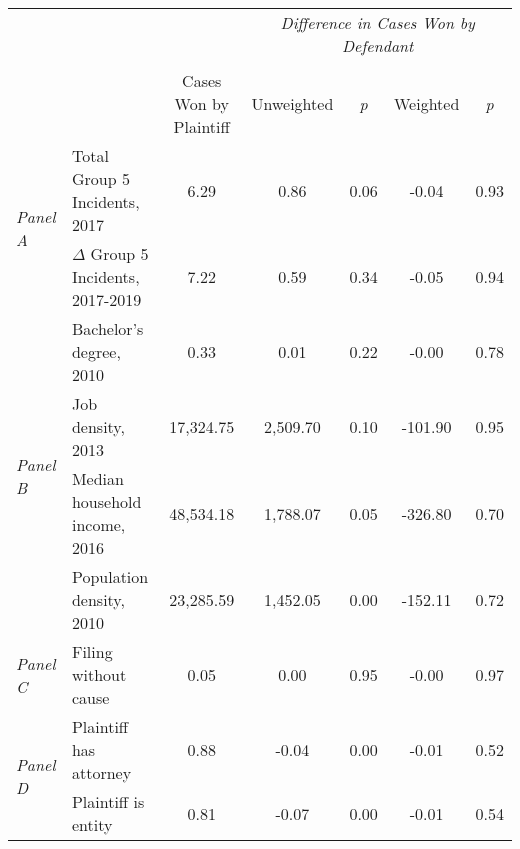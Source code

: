\begin{tabular}{llccccc}
\toprule
 &  & \textit{} & \multicolumn{4}{c}{\textit{Difference in Cases Won by Defendant}} \\
\cline{4-7}
\\
 &  & Cases Won by Plaintiff & Unweighted & \emph{p} & Weighted & \emph{p} \\
\midrule
\multirow[c]{2}{3cm}{\textit{Panel A}} & Total Group 5 Incidents, 2017 & 6.29 & 0.86 & 0.06 & -0.04 & 0.93 \\
 & $\Delta$ Group 5 Incidents, 2017-2019 & 7.22 & 0.59 & 0.34 & -0.05 & 0.94 \\
\cline{1-7}
\multirow[c]{4}{3cm}{\textit{Panel B}} & Bachelor's degree, 2010 & 0.33 & 0.01 & 0.22 & -0.00 & 0.78 \\
 & Job density, 2013 & 17,324.75 & 2,509.70 & 0.10 & -101.90 & 0.95 \\
 & Median household income, 2016 & 48,534.18 & 1,788.07 & 0.05 & -326.80 & 0.70 \\
 & Population density, 2010 & 23,285.59 & 1,452.05 & 0.00 & -152.11 & 0.72 \\
\cline{1-7}
\textit{Panel C} & Filing without cause & 0.05 & 0.00 & 0.95 & -0.00 & 0.97 \\
\cline{1-7}
\multirow[c]{2}{3cm}{\textit{Panel D}} & Plaintiff has attorney & 0.88 & -0.04 & 0.00 & -0.01 & 0.52 \\
 & Plaintiff is entity & 0.81 & -0.07 & 0.00 & -0.01 & 0.54 \\
\cline{1-7}
\bottomrule
\end{tabular}
